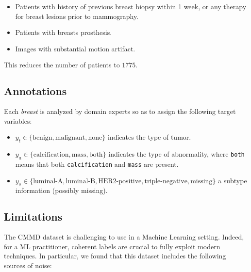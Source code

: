 \documentclass[11pt]{article}
\begin{document}
\begin{itemize}
\item Patients with history of previous breast biopsy within 1 week, or any therapy for breast lesions
prior to mammography.
\item Patients with breasts prosthesis.
\item Images with substantial motion artifact.
\end{itemize}

This reduces the number of patients to \(1775\).

\subsection{Annotations}
\label{sec:orgc3b642f}

Each \emph{breast} is analyzed by domain experts so as to assign the following
target variables:

\begin{itemize}
\item \(y_{t} \in \{\text{benign}, \text{malignant}, \text{none}\}\) indicates the type of tumor.
\item \(y_{a} \in \{\text{calcification}, \text{mass}, \text{both}\}\) indicates the type of abnormality, where \texttt{both} means that both \texttt{calcification} and \texttt{mass} are present.
\item \(y_s \in \{\text{luminal-A}, \text{luminal-B},\text{HER2-positive},\text{triple-negative},\text{missing}\}\) a
subtype information (possibly missing).
\end{itemize}

\subsection{\label{limitations}Limitations}
\label{sec:org97ca8d8}

The CMMD dataset is challenging to use in a Machine Learning setting.
Indeed, for a ML practitioner, coherent labels are crucial to fully exploit
modern techniques. In particular, we found that this dataset includes
the following sources of noise:
\end{document}
